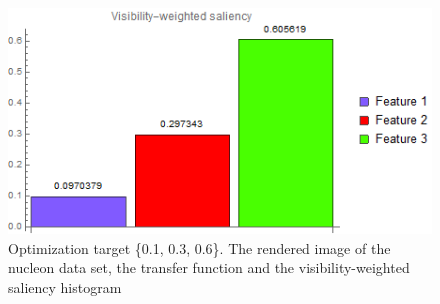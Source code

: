\begin{figure}
\begin{minipage}{.2\textwidth}
	\end{minipage}~
	\begin{minipage}{.4\textwidth}
		\includegraphics[width=1\linewidth]{images/nucleon_strong_red_optimized_fixed_visibility_saliency_weighted_chart}
	\end{minipage}
	\caption{Optimization target \{0.1, 0.3, 0.6\}. The rendered image of the nucleon data set, the transfer function and the visibility-weighted saliency histogram}
	\label{fig:nucleon_strong_red_optimized_fixed}
\end{figure}

